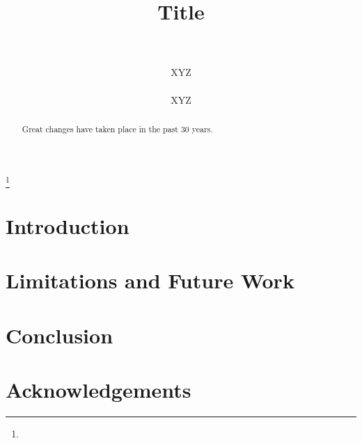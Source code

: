 \documentclass{article}
\title{Title \\ \
}
\author{\name XYZ
\email{xyz@xyz.edu} \\
\addr{XYZ} \\
\name XYZ
\email{xyz@xyz.edu} \\
\addr{XYZ}
}
\newcommand\nnfootnote[1]{%
  \begin{NoHyper}
  \renewcommand\thefootnote{}\footnote{#1}%
  \addtocounter{footnote}{-1}%
  \end{NoHyper}
}
\begin{document}
\maketitle
\raggedbottom

\nnfootnote{}

\begin{abstract}
Great changes have taken place in the past 30 years.
\end{abstract}

\section{Introduction} 

\section{Limitations and Future Work}



\section{Conclusion}



\section{Acknowledgements}



 

\begin{appendices}
\end{appendices}
\end{document}
